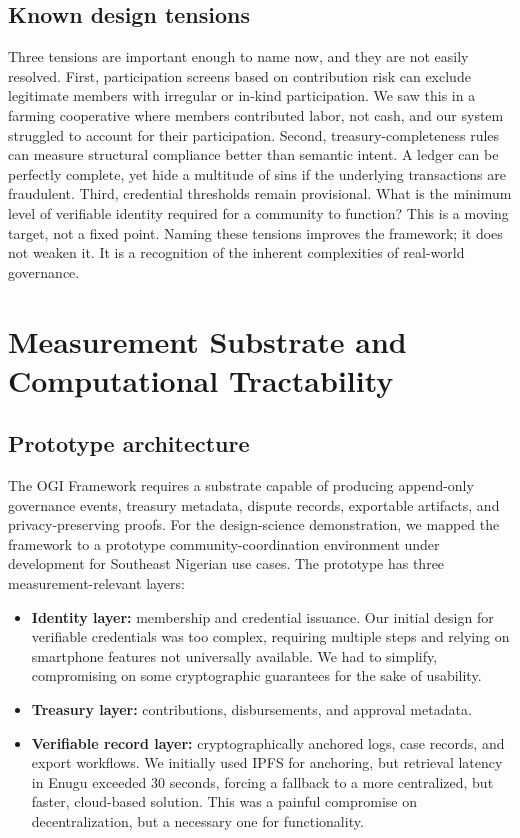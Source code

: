 \documentclass[sigconf,anonymous]{acmart}
\begin{document}
\subsection{Known design tensions}

Three tensions are important enough to name now, and they are not easily resolved. First, participation screens based on contribution risk can exclude legitimate members with irregular or in-kind participation. We saw this in a farming cooperative where members contributed labor, not cash, and our system struggled to account for their participation. Second, treasury-completeness rules can measure structural compliance better than semantic intent. A ledger can be perfectly complete, yet hide a multitude of sins if the underlying transactions are fraudulent. Third, credential thresholds remain provisional. What is the minimum level of verifiable identity required for a community to function? This is a moving target, not a fixed point. Naming these tensions improves the framework; it does not weaken it. It is a recognition of the inherent complexities of real-world governance.

\section{Measurement Substrate and Computational Tractability}

\subsection{Prototype architecture}

The OGI Framework requires a substrate capable of producing append-only governance events, treasury metadata, dispute records, exportable artifacts, and privacy-preserving proofs. For the design-science demonstration, we mapped the framework to a prototype community-coordination environment under development for Southeast Nigerian use cases. The prototype has three measurement-relevant layers:

\begin{itemize}
\item \textbf{Identity layer:} membership and credential issuance. Our initial design for verifiable credentials was too complex, requiring multiple steps and relying on smartphone features not universally available. We had to simplify, compromising on some cryptographic guarantees for the sake of usability.
\item \textbf{Treasury layer:} contributions, disbursements, and approval metadata.
\item \textbf{Verifiable record layer:} cryptographically anchored logs, case records, and export workflows. We initially used IPFS for anchoring, but retrieval latency in Enugu exceeded 30 seconds, forcing a fallback to a more centralized, but faster, cloud-based solution. This was a painful compromise on decentralization, but a necessary one for functionality.
\end{itemize}
\end{document}
